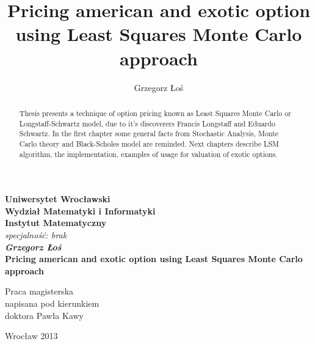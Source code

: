 \documentclass[a4paper,12pt]{article}
\title{Pricing american and exotic option using Least Squares Monte Carlo approach}
\author{Grzegorz Łoś}
\theoremstyle{definition}
\theoremstyle{remark}
\begin{document}
 
\newpage
\thispagestyle{empty}
\begin{center}
\textbf{\large Uniwersytet Wrocławski\\
Wydział Matematyki i Informatyki\\
Instytut Matematyczny}\\
\textit{\large specjalność: brak}\\
\vspace{4cm}
\textbf{\textit{\large Grzegorz Łoś}\\
\vspace{0.5cm}
{\Large Pricing american and exotic option using Least Squares Monte Carlo approach}}\\
\end{center}
\vspace{3cm}
{\hspace*{6.5cm}\large Praca magisterska\\
\hspace*{6.5cm}\large  napisana pod kierunkiem\\
\hspace*{6.5cm}\large  doktora Pawła Kawy }
\vfill
\begin{center}
{\large Wrocław 2013}\\
\end{center}

\newpage
\thispagestyle{empty}
\vspace*{10cm}

\newpage

\tableofcontents

\newpage

\begin{abstract}
  Thesis presents a technique of option pricing known as Least Squares Monte Carlo or Longstaff-Schwartz model, due to it's discoverers Francis Longstaff and Eduardo Schwartz. In the first chapter some general facts from Stochastic Analysis, Monte Carlo theory and Black-Scholes model are reminded. Next chapters describe LSM algorithm, the implementation, examples of usage for valuation of exotic options.
\end{abstract}
\end{document}
